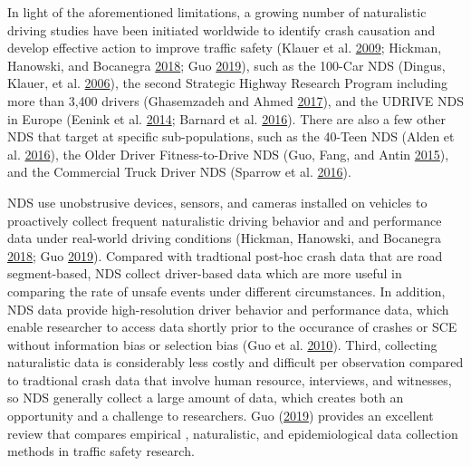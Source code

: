 \documentclass[12pt]{book}
\numberwithin{equation}{chapter}
\begin{document}
In light of the aforementioned limitations, a growing number of naturalistic driving studies have been initiated worldwide to identify crash causation and develop effective action to improve traffic safety (Klauer et al. \protect\hyperlink{ref-klauer2009comparing}{2009}; Hickman, Hanowski, and Bocanegra \protect\hyperlink{ref-hickman2018synthetic}{2018}; Guo \protect\hyperlink{ref-guo2019statistical}{2019}), such as the 100-Car NDS (Dingus, Klauer, et al. \protect\hyperlink{ref-dingus2006100}{2006}), the second Strategic Highway Research Program including more than 3,400 drivers (Ghasemzadeh and Ahmed \protect\hyperlink{ref-ghasemzadeh2017probit}{2017}), and the UDRIVE NDS in Europe (Eenink et al. \protect\hyperlink{ref-eenink2014udrive}{2014}; Barnard et al. \protect\hyperlink{ref-barnard2016study}{2016}). There are also a few other NDS that target at specific sub-populations, such as the 40-Teen NDS (Alden et al. \protect\hyperlink{ref-alden2016animal}{2016}), the Older Driver Fitness-to-Drive NDS (Guo, Fang, and Antin \protect\hyperlink{ref-guo2015older}{2015}), and the Commercial Truck Driver NDS (Sparrow et al. \protect\hyperlink{ref-sparrow2016naturalistic}{2016}).

NDS use unobstrusive devices, sensors, and cameras installed on vehicles to proactively collect frequent naturalistic driving behavior and and performance data under real-world driving conditions (Hickman, Hanowski, and Bocanegra \protect\hyperlink{ref-hickman2018synthetic}{2018}; Guo \protect\hyperlink{ref-guo2019statistical}{2019}). Compared with tradtional post-hoc crash data that are road segment-based, NDS collect driver-based data which are more useful in comparing the rate of unsafe events under different circumstances. In addition, NDS data provide high-resolution driver behavior and performance data, which enable researcher to access data shortly prior to the occurance of crashes or SCE without information bias or selection bias (Guo et al. \protect\hyperlink{ref-guo2010near}{2010}). Third, collecting naturalistic data is considerably less costly and difficult per observation compared to tradtional crash data that involve human resource, interviews, and witnesses, so NDS generally collect a large amount of data, which creates both an opportunity and a challenge to researchers. Guo (\protect\hyperlink{ref-guo2019statistical}{2019}) provides an excellent review that compares empirical , naturalistic, and epidemiological data collection methods in traffic safety research.
\end{document}
